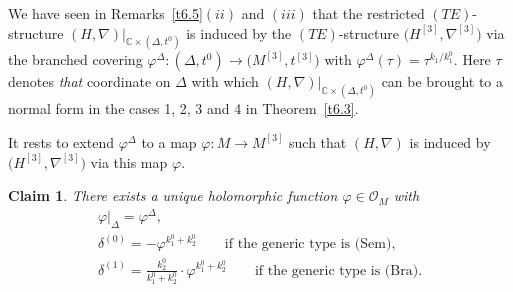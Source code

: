 \documentclass[pdftex]{sigma}%
\numberwithin{equation}{section}
\numberwithin{figure}{section}
\newcommand{\C}{{\mathbb C}}
\newcommand{\OO}{{\mathcal O}}
\newcommand{\nnn}{\nabla}
\newtheorem{claim}[Theorem]{Claim}
 { \theoremstyle{definition}
\newtheorem{Definition}[Theorem]{Definition}
\newtheorem{Remarks}[Theorem]{Remarks}
\newtheorem{Remark}[Theorem]{Remark}
\newtheorem{Notation}[Theorem]{Notation}
\newtheorem{Notations}[Theorem]{Notations} }
\begin{document}
We have seen in Remarks~\ref{t6.5}$(ii)$ and $(iii)$
that the restricted $(TE)$-structure
$(H,\nnn)|_{\C\times(\Delta,t^0)}$
is induced by the $(TE)$-structure $\big(H^{[3]},\nnn^{[3]}\big)$
via the branched covering
$\varphi^\Delta\colon (\Delta,t^0)\to\big(M^{[3]},t^{[3]}\big)$
with $\varphi^\Delta(\tau)= \tau^{k_1/k_1^0}$.
Here $\tau$ denotes {\it that} coordinate on $\Delta$
with which $(H,\nnn)|_{\C\times (\Delta,t^0)}$ can be
brought to a normal form in the cases 1, 2, 3 and 4 in
Theorem~\ref{t6.3}.

It rests to extend $\varphi^\Delta$ to a map
$\varphi\colon M\to M^{[3]}$ such that $(H,\nnn)$ is induced
by $\big(H^{[3]},\nnn^{[3]}\big)$ via this map $\varphi$.

\begin{claim}\label{cl8.9}
There exists a unique holomorphic function
$\varphi\in\OO_M$ with
\begin{gather}\label{8.32}
\varphi|_\Delta= \varphi^\Delta,
\\[.5ex]
\delta^{(0)}= -\varphi^{k_1^0+k_2^0}\qquad
\text{if the generic type is $($Sem$)$},\label{8.33}
\\
\delta^{(1)}= \frac{k_2^0}{k_1^0+k_2^0}\cdot\varphi^{k_1^0+k_2^0}
\qquad\text{if the generic type is $($Bra$)$}.\label{8.34}
\end{gather}
\end{claim}
\end{document}

